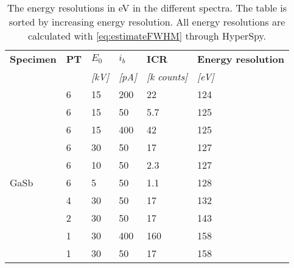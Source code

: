 \begin{table}[phtb]
    \begin{center}
        \caption{
            The energy resolutions in eV in the different spectra.
            The table is sorted by increasing energy resolution.
            All energy resolutions are calculated with \cref{eq:estimateFWHM} through HyperSpy.
        }
        \label{tab:results:energy_resolutions}
        \begin{tabular}{p{1.5cm}lllll}
            \hline
            \textbf{Specimen} & \textbf{PT} & \textbf{$E_0$} & \textbf{$i_b$} & \textbf{ICR}      & \textbf{Energy resolution} \\
            \emph{}           & \emph{}     & \emph{[kV]}    & \emph{[pA]}    & \emph{[k counts]} & \emph{[eV]}                \\
            \hline
                              & 6           & 15             & 200            & 22                & 124                        \\
                              & 6           & 15             & 50             & 5.7               & 125                        \\
                              & 6           & 15             & 400            & 42                & 125                        \\
                              & 6           & 30             & 50             & 17                & 127                        \\
                              & 6           & 10             & 50             & 2.3               & 127                        \\
            GaSb              & 6           & 5              & 50             & 1.1               & 128                        \\
                              & 4           & 30             & 50             & 17                & 132                        \\
                              & 2           & 30             & 50             & 17                & 143                        \\
                              & 1           & 30             & 400            & 160               & 158                        \\
                              & 1           & 30             & 50             & 17                & 158                        \\

\end{tabular}
\end{center}
\end{table}
